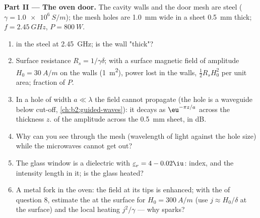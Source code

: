 \begin{problem}
\medskip
\noindent\textbf{Part II --- The oven door.}
The cavity walls and the door mesh are steel ($\gamma = \qty{1.0e6}{S/m}$);
the mesh holes are \qty{1.0}{mm} wide in a sheet \qty{0.5}{mm} thick;
$f = \qty{2.45}{GHz}$, $P = \qty{800}{W}$.
\begin{enumerate}[resume]
  \item {} in the steel at \qty{2.45}{GHz}; is the wall "thick"?
  \item Surface resistance $R_s = 1/\gamma\delta$; with a surface magnetic
        field of amplitude $H_0 = \qty{30}{A/m}$ on the walls (\qty{1}{m^2}),
        power lost in the walls, $\tfrac12R_sH_0^2$ per unit area; fraction
        of $P$.
  \item In a hole of width $a \ll \lambda$ the field cannot propagate (the
        hole is a waveguide below cut-off, \cref{ch:b2:guided-waves}):
        it decays as $\eu^{-\pi z/a}$ across the thickness $z$. 
        of the amplitude across the \qty{0.5}{mm} sheet, in dB.
  \item Why can you see through the mesh (wavelength of light
        against the hole size) while the microwaves cannot get out?
  \item The glass window is a dielectric with $\underline\varepsilon_r = 4 - 0.02\iu$:
        index, and the intensity  length in it; is the
        glass heated?
  \item A metal fork in the oven: the field at its tips is enhanced;
        with the  of question 8, estimate the  at the surface for $H_0 = \qty{300}{A/m}$ (use $j \approx H_0/\delta$
        at the surface) and the local heating $j^2/\gamma$ --- why sparks?
\end{enumerate}


\end{problem}
